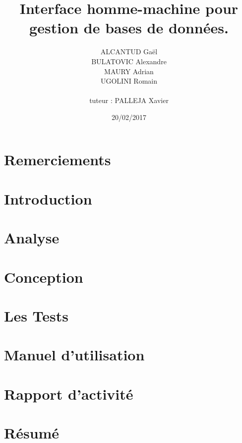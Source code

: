 \documentclass[12pt, a4paper, twoside, openright]{book}
\title{Interface homme-machine pour gestion de bases de données.}
\author{ALCANTUD Gaël \\ BULATOVIC Alexandre \\ MAURY Adrian \\ UGOLINI Romain \\ \\tuteur : PALLEJA Xavier}
\date{20/02/2017}
\begin{document}
\frontmatter
\maketitle

%

\thispagestyle{empty}
\chapter*{Remerciements}


\tableofcontents
\listoffigures
\printglossaries

\mainmatter
\chapter{Introduction}


\chapter{Analyse}


\chapter{Conception}\label{chapitre_conception}


\chapter{Les Tests}



\chapter{Manuel d'utilisation}


\chapter{Rapport d'activité}


\backmatter

\chapter{Résumé}

\end{document}
